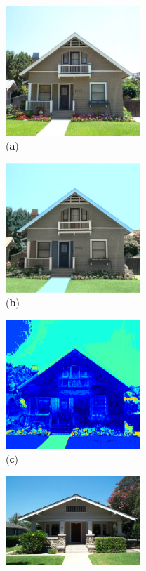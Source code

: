 \begin{figure}
    \centering
    \begin{subfigure}{2.1in}
        \centering
        \includegraphics[width=2in]{./Images/house1.png}
        \caption{(\textbf{a})}
    \end{subfigure}
    \begin{subfigure}{2.1in}
        \centering
        \includegraphics[width=2in]{./Images/house1_colored.png}
        \caption{(\textbf{b})}
    \end{subfigure}
    \begin{subfigure}{2.1in}
        \centering
        \includegraphics[width=2in]{./Images/house1_acc.png}
        \caption{(\textbf{c})}
    \end{subfigure}
    \begin{subfigure}{2.1in}
        \centering
        \includegraphics[width=2in]{./Images/house2.png}

\end{subfigure}
\end{figure}
